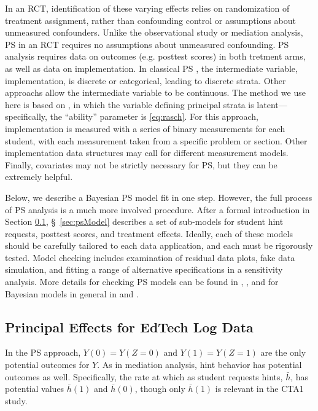 \documentclass{article}\usepackage[]{graphicx}\usepackage[]{color}
\begin{document}
In an RCT, identification of these varying effects relies on
randomization of treatment assignment,
rather than confounding control or assumptions about
unmeasured confounders.
Unlike the observational study or mediation analysis, PS in an RCT requires no assumptions about unmeasured confounding. 
PS analysis requires data on outcomes
(e.g. posttest scores) in both tretment arms, as well as data on
implementation.
In classical PS
\citep[e.g.][]{page2012principal,feller2016compared}, the intermediate
variable, implementation, is discrete or categorical, leading to
discrete strata.
Other approachs \citep[e.g.]{gilbertHudgens,jin2008principal} allow
the intermediate variable to be continuous.
The method we use here is based on \citet{aoas}, in which the variable
defining principal strata is latent---specifically, the ``ability''
parameter is \eqref{eq:rasch}.
For this approach, implementation is measured with a series of binary
measurements for each student, with each measurement taken from a
specific problem or section.
Other implementation data structures may call for different
measurement models.
Finally, covariates may not be strictly necessary for PS, but they can be extremely helpful.

Below, we describe a Bayesian PS model fit in one step.
However, the full process of PS analysis is a much more involved
procedure.
After a formal introduction in Section \ref{sec:psIntro},
\S~\ref{sec:psModel} describes a set of sub-models for student hint
requests, posttest scores, and treatment effects.
Ideally, each of these models should be carefully tailored to each
data application, and each must be rigorously tested.
Model checking includes examination of residual data plots, fake data
simulation, and fitting a range of alternative specifications in a
sensitivity analysis.
More details for checking PS models can be found in \citet{aoas},
\citet{psTutorial}, and for Bayesian models in general in
\citet{gelman2014bayesian} and \citet{mcelreath2020statistical}.

\subsection{Principal Effects for EdTech Log Data}\label{sec:psIntro}
In the PS approach, $Y(0)=Y(Z=0)$ and $Y(1)=Y(Z=1)$ are the only potential
outcomes for $Y$.
As in mediation analysis, hint behavior has potential outcomes as
well.
Specifically, the rate at which as student requests hints, $\bar{h}$,
has potential values $\bar{h}(1)$ and $\bar{h}(0)$,
though only $\bar{h}(1)$ is relevant in the CTA1 study.
\end{document}
